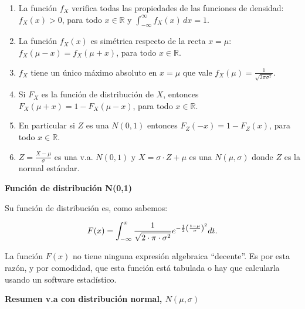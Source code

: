 \documentclass[]{book}
\providecommand{\tightlist}{%
  \setlength{\itemsep}{0pt}\setlength{\parskip}{0pt}}
\begin{document}
\begin{enumerate}
\def\labelenumi{\arabic{enumi}.}
\tightlist
\item
  La función \(f_{X}\) verifica todas las propiedades de las funciones de densidad: \(f_X(x)>0\), para todo \(x\in\mathbb{R}\) y \(\displaystyle\int_{-\infty}^\infty f_X(x)\,dx=1\).
\item
  La función \(f_X(x)\) es simétrica respecto de la recta \(x=\mu\): \(f_{X}(\mu-x)=f_{X}(\mu+x)\), para todo \(x\in\mathbb{R}\).
\item
  \(f_{X}\) tiene un único máximo absoluto en \(x=\mu\) que vale \(f_X(\mu)=\frac1{\sqrt{2\pi\sigma^2}}\).
\item
  Si \(F_{X}\) es la función de distribución de \(X\), entonces \(F_{X}(\mu+x)=1-F_{X}(\mu-x)\), para todo \(x\in\mathbb{R}\).
\item
  En particular si \(Z\) es una \(N(0,1)\) entonces \(F_{Z}(-x)=1-F_{Z}(x)\), para todo \(x\in\mathbb{R}\).
\item
  \(Z=\frac{X-\mu}{\sigma}\) es una v.a. \(N(0,1)\) y \(X=\sigma\cdot Z+\mu\) es una \(N(\mu,\sigma)\) donde \(Z\) es la normal estándar.
\end{enumerate}

\textbf{Función de distribución N(0,1)}

Su función de distribución es, como sabemos:

\[
F(x)=\displaystyle\int_{-\infty}^{x} {1\over{\sqrt{2\cdot \pi\cdot\sigma^2}}}
e^{-{1\over 2}{\left({t-\mu}\over{\sigma}\right)}^2} dt.
\]

La función \(F(x)\) no tiene ninguna expresión algebraica ``decente''. Es por esta razón, y por comodidad, que esta función está tabulada o hay que calcularla usando un software estadístico.

\textbf{Resumen v.a con distribución normal, \(N(\mu,\sigma)\)}
\end{document}
